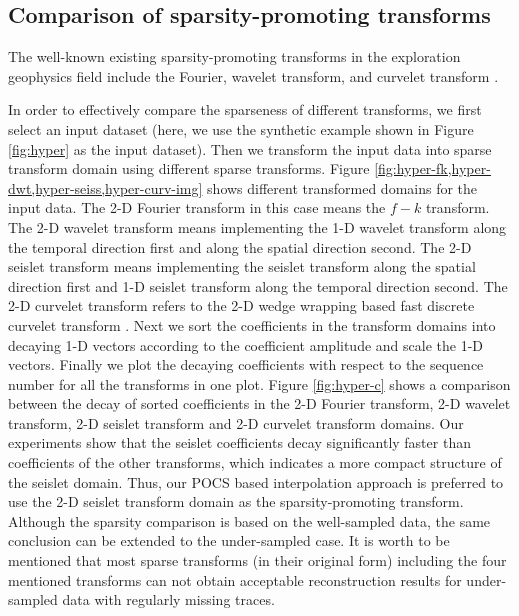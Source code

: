 \subsection{Comparison of sparsity-promoting transforms}
The well-known existing sparsity-promoting transforms in the exploration geophysics field include the Fourier\cite{chandrasekharan1949}, wavelet transform\cite{akansu2010}, and curvelet transform \cite{candes20061}. 

In order to effectively compare the sparseness of different transforms, we first select an input dataset (here, we use the synthetic example shown in Figure \ref{fig:hyper} as the input dataset). Then we transform the input data into sparse transform domain using different sparse transforms. Figure \ref{fig:hyper-fk,hyper-dwt,hyper-seiss,hyper-curv-img} shows different transformed domains for the input data. The 2-D Fourier transform in this case means the $f-k$ transform. The 2-D wavelet transform means implementing the 1-D wavelet transform along the temporal direction first and along the spatial direction second. The 2-D seislet transform means implementing the seislet transform along the spatial direction first and 1-D seislet transform along the temporal direction second. The 2-D curvelet transform refers to the 2-D wedge wrapping based fast discrete curvelet transform \cite{candes20061}. Next we sort the coefficients in the transform domains into decaying 1-D vectors according to the coefficient amplitude and scale the 1-D vectors. Finally we plot the decaying coefficients with respect to the sequence number for all the transforms in one plot. Figure \ref{fig:hyper-c} shows a comparison between the decay of sorted coefficients in the 2-D Fourier transform, 2-D wavelet transform, 2-D seislet transform and 2-D curvelet transform domains. Our experiments show that the seislet coefficients decay significantly faster than coefficients of the other transforms, which indicates a more compact structure of the seislet domain. Thus, our POCS based interpolation approach is preferred to use the 2-D seislet transform domain as the sparsity-promoting transform. Although the sparsity comparison is based on the well-sampled data, the same conclusion can be extended to the under-sampled case. It is worth to be mentioned that most sparse transforms (in their original form) including the four mentioned transforms can not obtain acceptable reconstruction results for under-sampled data with regularly missing traces.


